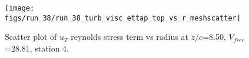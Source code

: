 \begin{figure}[H]
\centering
\texttt{[image: figs/run\_38/run\_38\_turb\_visc\_ettap\_top\_vs\_r\_meshscatter]}
\caption{Scatter plot of $
u_T$ reynolds stress term vs radius at $z/c$=8.50, $V_{free}$=28.81, station 4.}
\label{fig:run_38_turb_visc_ettap_top_vs_r_meshscatter}
\end{figure}



